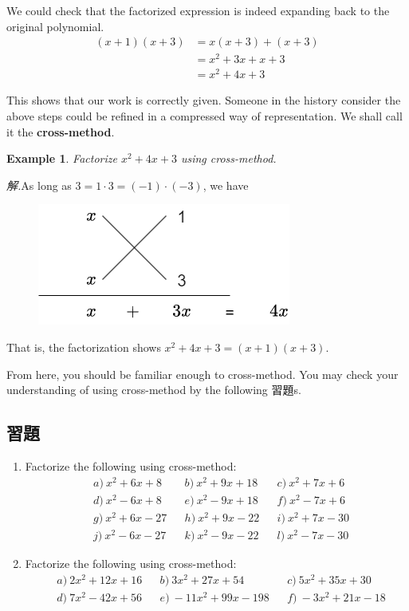 \documentclass[12pt]{article}
\newtheorem{example}{Example}
\begin{document}
    We could check that the factorized expression is indeed expanding back to the original polynomial.\begin{align*}
        (x+1)(x+3)&=x(x+3)+(x+3)\\
        &=x^2+3x+x+3\\
        &=x^2+4x+3
    \end{align*}

    This shows that our work is correctly given. Someone in the history consider the above steps could be refined in a compressed way of representation. We shall call it the \textbf{cross-method}.
    
    \begin{example}
        Factorize $x^2+4x+3$ using cross-method.
    \end{example}

    \textit{ 解.}As long as $3=1\cdot 3=(-1)\cdot(-3)$, we have 
    \begin{figure}[H]
        \centering
        \includegraphics[scale=0.6]{cross-method}
    \end{figure}
    \indent \indent That is, the factorization shows $x^2+4x+3=(x+1)(x+3)$.

    From here, you should be familiar enough to cross-method. You may check your understanding of using cross-method by the following 習題s.

    \subsection*{習題}
    \begin{enumerate}
        \item Factorize the following using cross-method:\begin{align*}
            &a)\ x^2+6x+8&&b)\ x^2+9x+18&&c)\ x^2+7x+6\\
            &d)\ x^2-6x+8&&e)\ x^2-9x+18&&f)\ x^2-7x+6\\
            &g)\ x^2+6x-27&&h)\ x^2+9x-22&&i)\ x^2+7x-30\\
            &j)\ x^2-6x-27&&k)\ x^2-9x-22&&l)\ x^2-7x-30
        \end{align*}
        \item Factorize the following using cross-method:\begin{align*}
            &a)\ 2x^2+12x+16&&b)\ 3x^2+27x+54&&c)\ 5x^2+35x+30\\
            &d)\ 7x^2-42x+56&&e)\ -11x^2+99x-198&&f)\ -3x^2+21x-18
        \end{align*}
    \end{enumerate}
\end{document}

